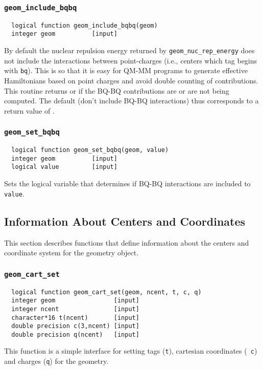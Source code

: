 \subsubsection{{\tt geom\_include\_bqbq}}
\label{sec:incbqbq}
\begin{verbatim}
  logical function geom_include_bqbq(geom)
  integer geom          [input]
\end{verbatim}
By default the nuclear repulsion energy returned by
\verb+geom_nuc_rep_energy+ does not include the interactions between
point-charges (i.e., centers which tag begins with \verb+bq+).  This
is so that it is easy for QM-MM programs to generate effective
Hamiltonians based on point charges and avoid double counting of
contributions.  This routine returns \TRUE or \FALSE
if the BQ-BQ contributions are or are not being computed.  The default
(don't include BQ-BQ interactions) thus corresponds to a return value
of \FALSE.

\subsubsection{{\tt geom\_set\_bqbq}}
\label{sec:setbqbq}
\begin{verbatim}
  logical function geom_set_bqbq(geom, value)
  integer geom          [input]
  logical value         [input]
\end{verbatim}
Sets the logical variable that determines if BQ-BQ interactions are
included to {\tt value}.

\subsection{Information About Centers and Coordinates}

This section describes functions that define information about the
centers and coordinate system for the geometry object.

\subsubsection{{\tt geom\_cart\_set}}
\begin{verbatim}
  logical function geom_cart_set(geom, ncent, t, c, q)
  integer geom                [input]
  integer ncent               [input]
  character*16 t(ncent)       [input]
  double precision c(3,ncent) [input]
  double precision q(ncent)   [input]
\end{verbatim}
This function is a simple interface for setting tags ({\tt t}), 
cartesian coordinates ({\tt
  c}) and charges ({\tt q}) for the geometry.

